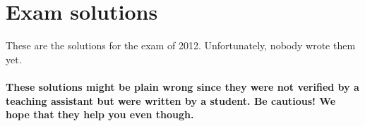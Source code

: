 \documentclass[main]{subfiles}
\begin{document}

\section{Exam solutions}
These are the solutions for the exam of 2012. Unfortunately, nobody wrote them yet.\\\\
\textbf{These solutions might be plain wrong since they were not verified by a teaching assistant but were written by a student. Be cautious! We hope that they help you even though.}

\end{document}
